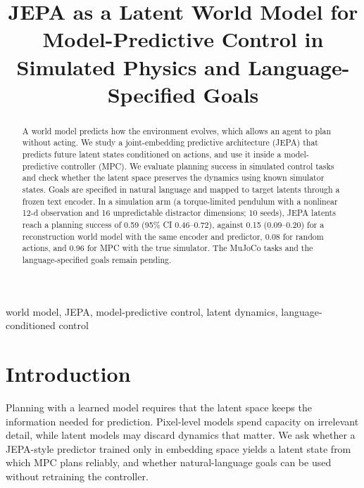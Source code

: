 \documentclass[conference]{IEEEtran}
\begin{document}
\title{JEPA as a Latent World Model for Model-Predictive Control in Simulated Physics and Language-Specified Goals}

\author{
}

\maketitle

\begin{abstract}
A world model predicts how the environment evolves, which allows an agent to plan without acting. We study a joint-embedding predictive architecture (JEPA) that predicts future latent states conditioned on actions, and use it inside a model-predictive controller (MPC). We evaluate planning success in simulated control tasks and check whether the latent space preserves the dynamics using known simulator states. Goals are specified in natural language and mapped to target latents through a frozen text encoder. In a simulation arm (a torque-limited pendulum with a nonlinear 12-d observation and 16 unpredictable distractor dimensions; 10 seeds), JEPA latents reach a planning success of 0.59 (95\% CI 0.46--0.72), against 0.15 (0.09--0.20) for a reconstruction world model with the same encoder and predictor, 0.08 for random actions, and 0.96 for MPC with the true simulator. The MuJoCo tasks and the language-specified goals remain pending.
\end{abstract}

\begin{IEEEkeywords}
world model, JEPA, model-predictive control, latent dynamics, language-conditioned control
\end{IEEEkeywords}

\section{Introduction}
Planning with a learned model requires that the latent space keeps the information needed for prediction. Pixel-level models spend capacity on irrelevant detail, while latent models may discard dynamics that matter. We ask whether a JEPA-style predictor trained only in embedding space yields a latent state from which MPC plans reliably, and whether natural-language goals can be used without retraining the controller.
\end{document}
